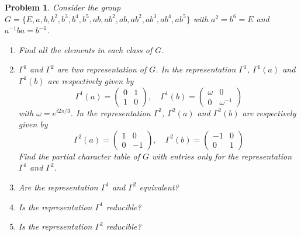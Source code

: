 \documentclass[UTF8,10pt,a4paper]{article}
\theoremstyle{Problem}
\newtheorem{prob}{Problem}
\theoremstyle{Solution}
\begin{document}
\begin{prob}
    Consider the group $G=\{E,a,b,b^2,b^3,b^4,b^5,ab,ab^2,ab,ab^2,ab^3,ab^4,ab^5\}$ with $a^2=b^6=E$ and $a^{-1}ba=b^{-1}$.
    \begin{enumerate}
        \item[(a)] Find all the elements in each class of $G$.
        \item[(b)] $\Gamma^1$ and $\Gamma^2$ are two representation of $G$. In the representation $\Gamma^1$, $\Gamma^1(a)$ and $\Gamma^1(b)$ are respectively given by
        \[
            \Gamma^1(a)=\left(\begin{matrix}
                0&1\\
                1&0
            \end{matrix}\right),\quad\Gamma^1(b)=\left(\begin{matrix}
                \omega&0\\
                0&\omega^{-1}
            \end{matrix}\right)
        \]
        with $\omega=e^{i2\pi/3}$. In the representation $\Gamma^2$, $\Gamma^2(a)$ and $\Gamma^2(b)$ are respectively given by
        \[
            \Gamma^2(a)=\left(\begin{matrix}
                1&0\\
                0&-1
            \end{matrix}\right),\quad\Gamma^2(b)=\left(\begin{matrix}
                -1&0\\
                0&1
            \end{matrix}\right)
        \]
        Find the partial character table of $G$ with entries only for the representation $\Gamma^1$ and $\Gamma^2$.
        \item[(c)] Are the representation $\Gamma^1$ and $\Gamma^2$ equivalent?
        \item[(d)] Is the representation $\Gamma^1$ reducible?
        \item[(e)] Is the representation $\Gamma^2$ reducible?
    \end{enumerate}
\end{prob}
\end{document}
